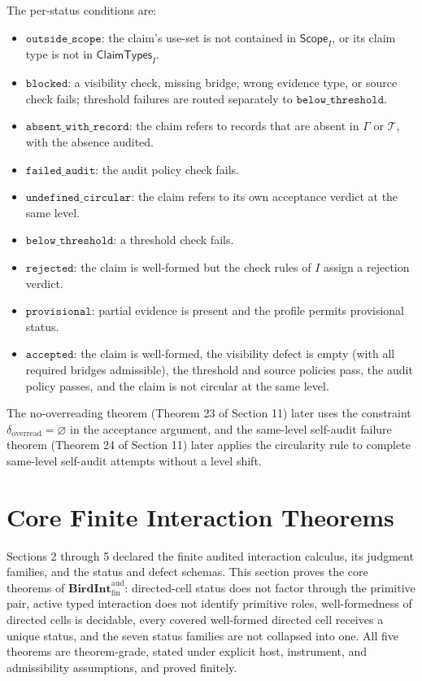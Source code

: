 \documentclass[11pt]{article}
\providecommand{\tightlist}{}
\theoremstyle{definition}
\begin{document}
The per-status conditions are:

\begin{itemize}
\tightlist
\item
  \(\texttt{outside\_scope}\): the claim's use-set is not contained in \(\mathsf{Scope}_I\), or its claim type is not in \(\mathsf{ClaimTypes}_I\).
\item
  \(\texttt{blocked}\): a visibility check, missing bridge, wrong evidence type, or source check fails; threshold failures are routed separately to \(\texttt{below\_threshold}\).
\item
  \(\texttt{absent\_with\_record}\): the claim refers to records that are absent in \(\Gamma\) or \(\mathcal T\), with the absence audited.
\item
  \(\texttt{failed\_audit}\): the audit policy check fails.
\item
  \(\texttt{undefined\_circular}\): the claim refers to its own acceptance verdict at the same level.
\item
  \(\texttt{below\_threshold}\): a threshold check fails.
\item
  \(\texttt{rejected}\): the claim is well-formed but the check rules of \(I\) assign a rejection verdict.
\item
  \(\texttt{provisional}\): partial evidence is present and the profile permits provisional status.
\item
  \(\texttt{accepted}\): the claim is well-formed, the visibility defect is empty (with all required bridges admissible), the threshold and source policies pass, the audit policy passes, and the claim is not circular at the same level.
\end{itemize}

The no-overreading theorem (Theorem 23 of Section 11) later uses the constraint \(\delta_{\mathrm{overread}}=\varnothing\) in the acceptance argument, and the same-level self-audit failure theorem (Theorem 24 of Section 11) later applies the circularity rule to complete same-level self-audit attempts without a level shift.
 \section{Core Finite Interaction Theorems}

Sections 2 through 5 declared the finite audited interaction calculus, its judgment families, and the status and defect schemas. This section proves the core theorems of \(\mathbf{BirdInt}^{\mathrm{aud}}_{\mathrm{fin}}\): directed-cell status does not factor through the primitive pair, active typed interaction does not identify primitive roles, well-formedness of directed cells is decidable, every covered well-formed directed cell receives a unique status, and the seven status families are not collapsed into one. All five theorems are theorem-grade, stated under explicit host, instrument, and admissibility assumptions, and proved finitely.
\end{document}
